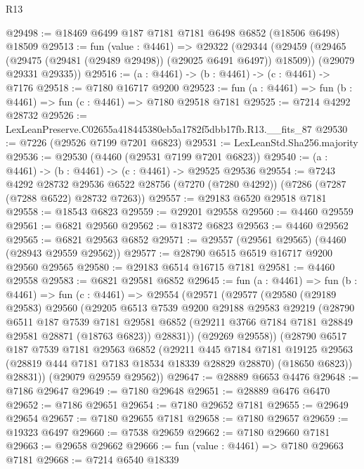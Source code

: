 \begin{lexlean}{R13}
\begin{coremodule}
@29498 := @18469 @6499 @187 @7181 @7181 @6498 @6852 (@18506 @6498) @18509
@29513 := fun (value : @4461) =>
  @29322
    (@29344
      (@29459 (@29465 (@29475 (@29481 (@29489 @29498)) (@29025 @6491 @6497)) @18509))
      (@29079 @29331 @29335))
@29516 := (a : @4461) -> (b : @4461) -> (c : @4461) -> @7176
@29518 := @7180 @16717 @9200
@29523 := fun (a : @4461) => fun (b : @4461) => fun (c : @4461) => @7180 @29518 @7181
@29525 := @7214 @4292 @28732
@29526 := LexLeanPreserve.C02655a418445380eb5a1782f5dbb17fb.R13.__fits_87
@29530 := @7226 (@29526 @7199 @7201 @6823)
@29531 := LexLeanStd.Sha256.majority
@29536 := @29530 (@4460 (@29531 @7199 @7201 @6823))
@29540 := (a : @4461) -> (b : @4461) -> (c : @4461) -> @29525 @29536
@29554 := @7243
    @4292
    @28732
    @29536
    @6522
    @28756
    (@7270 (@7280 @4292))
    (@7286 (@7287 (@7288 @6522) @28732 @7263))
@29557 := @29183 @6520 @29518 @7181
@29558 := @18543 @6823
@29559 := @29201 @29558
@29560 := @4460 @29559
@29561 := @6821 @29560
@29562 := @18372 @6823
@29563 := @4460 @29562
@29565 := @6821 @29563 @6852
@29571 := @29557 (@29561 @29565) (@4460 (@28943 @29559 @29562))
@29577 := @28790 @6515 @6519 @16717 @9200 @29560 @29565
@29580 := @29183 @6514 @16715 @7181
@29581 := @4460 @29558
@29583 := @6821 @29581 @6852
@29645 := fun (a : @4461) =>
  fun (b : @4461) =>
  fun (c : @4461) =>
  @29554
    (@29571
      (@29577
        (@29580
          (@29189 @29583)
          @29560
          (@29205
            @6513
            @7539
            @9200
            @29188
            @29583
            @29219
            (@28790
              @6511
              @187
              @7539
              @7181
              @29581
              @6852
              (@29211 @3766 @7184 @7181 @28849 @29581 @28871 (@18763 @6823))
              @28831))
          (@29269 @29558))
        (@28790
          @6517
          @187
          @7539
          @7181
          @29563
          @6852
          (@29211
            @445
            @7184
            @7181
            @19125
            @29563
            (@28819 @444 @7181 @7183 @18534 @18339 @28829 @28870)
            (@18650 @6823))
          @28831))
      (@29079 @29559 @29562))
@29647 := @28889 @6653 @4476
@29648 := @7186 @29647
@29649 := @7180 @29648
@29651 := @28889 @6476 @6470
@29652 := @7186 @29651
@29654 := @7180 @29652 @7181
@29655 := @29649 @29654
@29657 := @7180 @29655 @7181
@29658 := @7180 @29657
@29659 := @19323 @6497
@29660 := @7538 @29659
@29662 := @7180 @29660 @7181
@29663 := @29658 @29662
@29666 := fun (value : @4461) => @7180 @29663 @7181
@29668 := @7214 @6540 @18339

\end{coremodule}
\end{lexlean}
